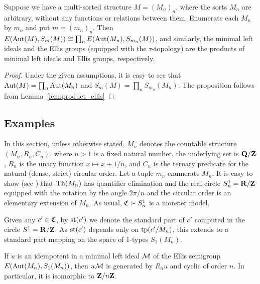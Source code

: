 	
	\begin{prop}\label{prop:product of Ellis groups}
		Suppose we have a multi-sorted structure $M=(M_n)_n$, where the sorts $M_n$ are arbitrary, without any functions or relations between them. Enumerate each $M_n$ by $m_n$ and put $m=(m_n)_n$. Then $E(\operatorname{{Aut}}(M),S_m(M))\cong \prod_n E(\operatorname{{Aut}}(M_n),S_{m_n}(M))$, and similarly, the minimal left ideals and the Ellis groups (equipped with the $\tau$-topology) are the products of minimal left ideals and Ellis groups, respectively.
	\end{prop}
	\begin{proof}
		Under the given assumptions, it is easy to see that $\operatorname{{Aut}}(M)=\prod_n \operatorname{{Aut}}(M_n)$ and $S_m(M)=\prod_n S_{m_n}(M_n)$. The proposition follows from Lemma~\ref{lem:product_ellis}
	\end{proof}
	
	
	\subsection*{Examples}
	
	In this section, unless otherwise stated, $M_n$ denotes the countable structure $(M_n,R_n,C_n)$, where $n>1$ is a fixed natural number, the underlying set is ${{\mathbf{Q}}}/{{\mathbf{Z}}}$, $R_n$ is the unary function $x\mapsto x+1/n$, and $C_n$ is the ternary predicate for the natural (dense, strict) circular order. Let a tuple $m_n$ enumerate $M_n$. It is easy to show (see \cite[Proposition 4.2]{CLPZ01}) that $\operatorname{{Th}}(M_n)$ has quantifier elimination and the real circle $S^1_n={\mathbf{R}}/{\mathbf{Z}}$ equipped with the rotation by the angle $2\pi/n$ and the circular order is an elementary extension of $M_n$. As usual, ${\mathfrak C} \succ S^1_n$ is a monster model.
	
	Given any $c' \in {\mathfrak C}$, by $\operatorname{{st}}(c')$ we denote the standard part of $c'$ computed in the circle $S^1={\mathbf{R}}/{\mathbf{Z}}$.
	As $\operatorname{{st}}(c')$ depends only on $\operatorname{{tp}}(c'/M_n)$, this extends to a standard part mapping on the space of 1-types $S_1(M_n)$.
	
	\begin{prop}
		\label{prop:group_onetypes}
		If $u$ is an idempotent in a minimal left ideal ${\mathcal M}$ of  the Ellis semigroup $E(\operatorname{{Aut}}(M_n),S_1(M_n))$, then $u{\mathcal M}$ is generated by $R_nu$ and cyclic of order $n$. In particular, it is isomorphic to ${{\mathbf{Z}}}/n{{\mathbf{Z}}}$.
	\end{prop}
	
